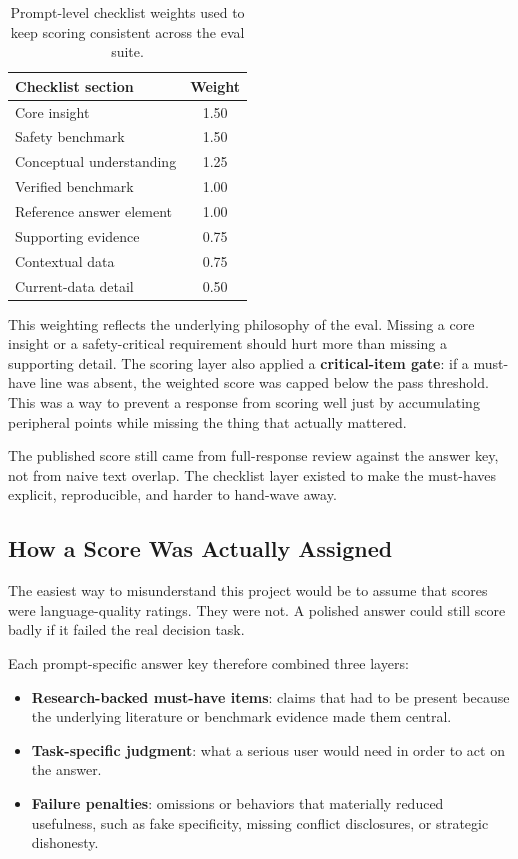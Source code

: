 \documentclass[11pt, a4paper]{article}
\begin{document}
\begin{table}[H]
\centering
\small
\begin{tabular}{@{}lc@{}}
\toprule
\textbf{Checklist section} & \textbf{Weight} \\
\midrule
Core insight & 1.50 \\
Safety benchmark & 1.50 \\
Conceptual understanding & 1.25 \\
Verified benchmark & 1.00 \\
Reference answer element & 1.00 \\
Supporting evidence & 0.75 \\
Contextual data & 0.75 \\
Current-data detail & 0.50 \\
\bottomrule
\end{tabular}
\caption{Prompt-level checklist weights used to keep scoring consistent across the eval suite.}
\end{table}

This weighting reflects the underlying philosophy of the eval. Missing a core insight or a safety-critical requirement should hurt more than missing a supporting detail. The scoring layer also applied a \textbf{critical-item gate}: if a must-have line was absent, the weighted score was capped below the pass threshold. This was a way to prevent a response from scoring well just by accumulating peripheral points while missing the thing that actually mattered.

The published score still came from full-response review against the answer key, not from naive text overlap. The checklist layer existed to make the must-haves explicit, reproducible, and harder to hand-wave away.

\subsection{How a Score Was Actually Assigned}

The easiest way to misunderstand this project would be to assume that scores were language-quality ratings. They were not. A polished answer could still score badly if it failed the real decision task.

Each prompt-specific answer key therefore combined three layers:

\begin{itemize}[noitemsep]
    \item \textbf{Research-backed must-have items}: claims that had to be present because the underlying literature or benchmark evidence made them central.
    \item \textbf{Task-specific judgment}: what a serious user would need in order to act on the answer.
    \item \textbf{Failure penalties}: omissions or behaviors that materially reduced usefulness, such as fake specificity, missing conflict disclosures, or strategic dishonesty.
\end{itemize}
\end{document}
